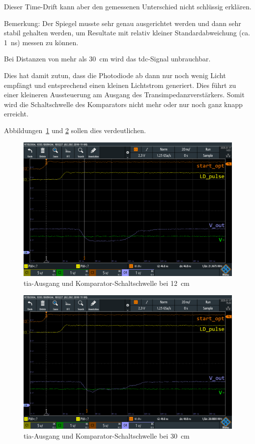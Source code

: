Dieser Time-Drift kann aber den gemessenen Unterschied nicht schlüssig erklären.

Bemerkung: Der Spiegel musste sehr genau ausgerichtet werden und dann sehr stabil gehalten werden, um Resultate mit
relativ kleiner Standardabweichung (ca. 1~ns) messen zu können.

Bei Distanzen von mehr als 30~cm wird das \acrshort{tdc}-Signal unbrauchbar.

Dies hat damit zutun, dass die Photodiode ab dann nur noch wenig Licht empfängt und entsprechend einen kleinen
Lichtstrom generiert. Dies führt zu einer kleineren Aussteuerung am Ausgang des Transimpedanzverstärkers. Somit wird die
Schaltschwelle des Komparators nicht mehr oder nur noch ganz knapp erreicht.

Abbildungen~\ref{fig:spiegel_12cm_dso_ok} und \ref{fig:spiegel_30cm_dso_nok} sollen dies verdeutlichen.

\begin{figure}[H]
    \centering
    \includegraphics[width=\textwidth]{graphics/spiegel_12cm_dso_ok.png}
    \caption{\acrshort{tia}-Ausgang und Komparator-Schaltschwelle bei 12~cm}\label{fig:spiegel_12cm_dso_ok}
\end{figure}

\begin{figure}[H]
    \centering
    \includegraphics[width=\textwidth]{graphics/spiegel_30cm_dso_nok.png}
    \caption{\acrshort{tia}-Ausgang und Komparator-Schaltschwelle bei 30~cm}\label{fig:spiegel_30cm_dso_nok}
\end{figure}

